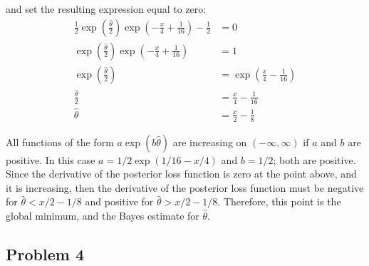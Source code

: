 \documentclass{article}
\begin{document}
and set the resulting expression equal to zero: 
\begin{align*}
\frac{1}{2}\exp\left(\frac{\hat{\theta}}{2}\right)\exp\left(-\frac{x}{4}+\frac{1}{16}\right) - \frac{1}{2} &= 0 \\
\exp\left(\frac{\hat{\theta}}{2}\right)\exp\left(-\frac{x}{4}+\frac{1}{16}\right) &= 1 \\ 
\exp\left(\frac{\hat{\theta}}{2}\right) &= \exp\left(\frac{x}{4}-\frac{1}{16}\right) \\
\frac{\hat{\theta}}{2} &= \frac{x}{4}-\frac{1}{16} \\
\hat{\theta} &= \frac{x}{2}-\frac{1}{8}
\end{align*}
\pagebreak

All functions of the form $a\exp(b\hat{\theta})$ are increasing on $(-\infty, \infty)$ if $a$ and $b$ are positive. In this case $a = 1/2\exp(1/16-x/4)$ and $b=1/2$; both are positive.             Since the derivative of the posterior loss function is zero at the point above, and it is increasing, then the derivative of the posterior loss function must be negative for $\hat{\theta} < x/2-1/8$ and positive for $\hat{\theta} > x/2-1/8$. Therefore, this point is the global minimum, and the Bayes estimate for $\hat{\theta}$. 

\subsection*{Problem 4}
\end{document}
